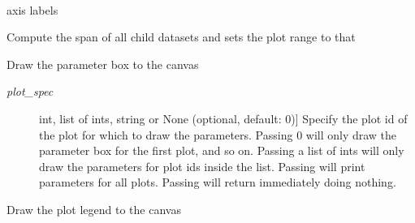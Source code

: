 \documentclass[a4paper,10pt,english]{sphinxmanual}
\begin{document}
\begin{fulllineitems}
\label{index:kafe.plot.Plot}~

\begin{fulllineitems}
\label{index:kafe.plot.Plot.axis_labels}
axis labels

\end{fulllineitems}


\begin{fulllineitems}
\label{index:kafe.plot.Plot.compute_plot_range}
Compute the span of all child datasets and sets the plot range to that

\end{fulllineitems}


\begin{fulllineitems}
\label{index:kafe.plot.Plot.draw_fit_parameters_box}
Draw the parameter box to the canvas
\begin{description}
\item[{\emph{plot\_spec}}] \leavevmode{[}int, list of ints, string or None (optional, default: 0){]}
Specify the plot id of the plot for which to draw the parameters. Passing 0 will only draw the
parameter box for the first plot, and so on. Passing a list of ints will only draw the parameters
for plot ids inside the list. Passing  will print parameters for all plots. Passing
 will return immediately doing nothing.

\end{description}

\end{fulllineitems}


\begin{fulllineitems}
\label{index:kafe.plot.Plot.draw_legend}
Draw the plot legend to the canvas

\end{fulllineitems}


\end{fulllineitems}
\end{document}
